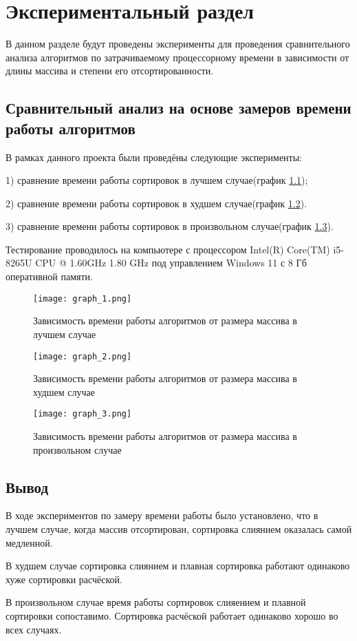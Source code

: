\chapter{Экспериментальный раздел}
\label{cha:research}
    В данном разделе будут проведены эксперименты для проведения 
    сравнительного анализа алгоритмов по затрачиваемому процессорному 
    времени в зависимости от длины массива и степени его отсортированности.

    \section{Сравнительный анализ на основе замеров времени работы алгоритмов}
        В рамках данного проекта были проведёны следующие эксперименты:

        1) сравнение времени работы сортировок в лучшем случае(график \ref{graph:test:1});
        
        2) сравнение времени работы сортировок в худшем случае(график \ref{graph:test:2}).

        3) сравнение времени работы сортировок в произвольном случае(график \ref{graph:test:3}).
        
        Тестирование проводилось на компьютере с процессором
        Intel(R) Core(TM) i5-8265U CPU @ 1.60GHz 1.80 GHz под управлением Windows 11 с 8 Гб оперативной памяти.\\

        \begin{figure}[h!]
            \centering
            \texttt{[image: graph\_1.png]}
            \caption{Зависимость времени работы алгоритмов от размера массива в лучшем случае}
            \label{graph:test:1}
        \end{figure}
        \newpage
        \begin{figure}[h!]
            \texttt{[image: graph\_2.png]}
            \caption{Зависимость времени работы алгоритмов от размера массива в худшем случае}
            \label{graph:test:2}
        \end{figure}
        \newpage
        \begin{figure}[h!]
            \texttt{[image: graph\_3.png]}
            \caption{Зависимость времени работы алгоритмов от размера массива в произвольном случае}
            \label{graph:test:3}
        \end{figure}



    \section{Вывод}
        \par В ходе экспериментов по замеру времени работы было установлено, что в лучшем случае, когда массив отсортирован, сортировка слиянием оказалась самой медленной.
        \par В худшем случае сортировка слиянием и плавная сортировка работают одинаково хуже сортировки расчёской.
        \par В произвольном случае время работы сортировок слияением и плавной сортировки сопоставимо.
        Сортировка расчёской работает одинаково хорошо во всех случаях.


\newpage